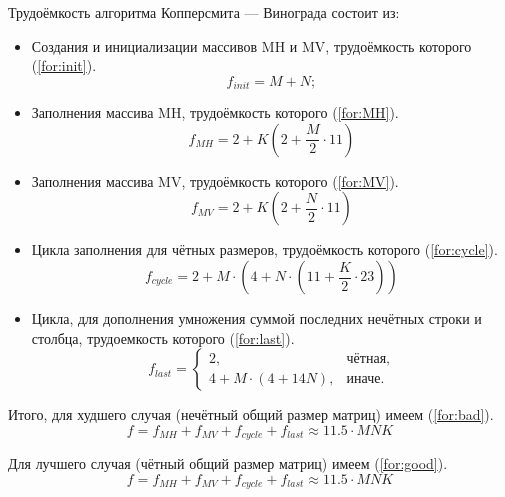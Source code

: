 Трудоёмкость алгоритма Копперсмита --- Винограда состоит из:
\begin{itemize}
	\item Создания и инициализации массивов MH и MV, трудоёмкость которого (\ref{for:init}).
	\begin{equation}
		\label{for:init}
		f_{init} = M + N;
	\end{equation}
	
	\item Заполнения массива MH, трудоёмкость которого (\ref{for:MH}).
	\begin{equation}
		\label{for:MH}
		f_{MH} = 2 + K (2 + \frac{M}{2} \cdot 11)
	\end{equation}
	
	\item Заполнения массива MV, трудоёмкость которого (\ref{for:MV}).
	\begin{equation}
		\label{for:MV}
		f_{MV} = 2 + K (2 + \frac{N}{2} \cdot 11)
	\end{equation}
	
	\item Цикла заполнения для чётных размеров, трудоёмкость которого (\ref{for:cycle}).
	\begin{equation}
		\label{for:cycle}
		f_{cycle} = 2 + M \cdot (4 + N \cdot (11 + \frac{K}{2} \cdot 23))
	\end{equation}
	
	\item Цикла, для дополнения умножения суммой последних нечётных строки и столбца, трудоемкость которого (\ref{for:last}).
	\begin{equation}
		\label{for:last}
		f_{last} = \begin{cases}
			2, & \text{чётная,}\\
			4 + M \cdot (4 + 14N), & \text{иначе.}
		\end{cases}
	\end{equation}
\end{itemize}

Итого, для худшего случая (нечётный общий размер матриц) имеем (\ref{for:bad}).
\begin{equation}
	\label{for:bad}
	f =  f_{MH} + f_{MV} + f_{cycle} + f_{last}\approx 11.5 \cdot MNK
\end{equation}

Для лучшего случая (чётный общий размер матриц) имеем (\ref{for:good}).
\begin{equation}
	\label{for:good}
f =  f_{MH} + f_{MV} + f_{cycle} + f_{last} \approx 11.5 \cdot MNK
\end{equation}


